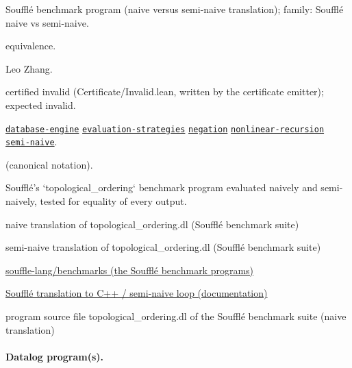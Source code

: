 \documentclass[10pt]{article}
\begin{document}
\begin{description}[leftmargin=2.6cm,style=nextline,itemsep=1pt]

\item[Category] Soufflé benchmark program (naive versus semi-naive translation); family: Soufflé naive vs semi-naive.

\item[Kind] equivalence.

\item[Contributors] Leo Zhang.

\item[Status] certified invalid (Certificate/Invalid.lean, written by the certificate emitter); expected invalid.

\item[Tags] \hyperref[tag:database-engine]{\texttt{database-engine}} \hyperref[tag:evaluation-strategies]{\texttt{evaluation-strategies}} \hyperref[tag:negation]{\texttt{negation}} \hyperref[tag:nonlinear-recursion]{\texttt{nonlinear-recursion}} \hyperref[tag:semi-naive]{\texttt{semi-naive}}.

\item[Input]  (canonical notation).

\item[Summary] Soufflé's `topological\_ordering` benchmark program evaluated naively and semi-naively, tested for equality of every output.

\item[Sides] naive translation of topological\_ordering.dl (Soufflé benchmark suite) \par semi-naive translation of topological\_ordering.dl (Soufflé benchmark suite)

\item[Sources] {\raggedright \href{https://github.com/souffle-lang/benchmarks}{souffle-lang/benchmarks (the Soufflé benchmark programs)} \par \href{https://souffle-lang.github.io/translate}{Soufflé translation to C++ / semi-naive loop (documentation)} \par program source file topological\_ordering.dl of the Soufflé benchmark suite (naive translation)\par}

\end{description}

\paragraph{Datalog program(s).}
\end{document}
